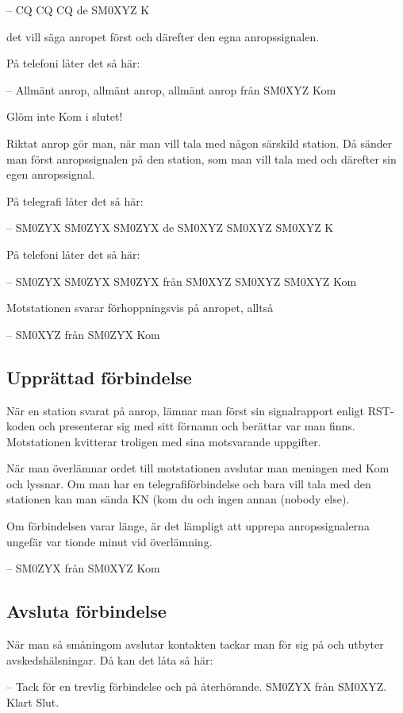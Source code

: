 -- CQ CQ CQ de SM0XYZ K

det vill säga anropet först och därefter den egna anropssignalen.

På telefoni låter det så här:

-- Allmänt anrop, allmänt anrop, allmänt anrop från SM0XYZ Kom

Glöm inte Kom i slutet!

Riktat anrop gör man, när man vill tala med någon särskild station.
Då sänder man först anropssignalen på den station, som man vill tala med och
därefter sin egen anropssignal.

På telegrafi låter det så här:

-- SM0ZYX SM0ZYX SM0ZYX de SM0XYZ SM0XYZ SM0XYZ K

På telefoni låter det så här:

-- SM0ZYX SM0ZYX SM0ZYX från SM0XYZ SM0XYZ SM0XYZ Kom

Motstationen svarar förhoppningsvis på anropet, alltså

-- SM0XYZ från SM0ZYX Kom

\subsection{Upprättad förbindelse}

När en station svarat på anrop, lämnar man först sin signalrapport
enligt RST-koden och presenterar sig med sitt förnamn och berättar var man finns.
Motstationen kvitterar troligen med sina motsvarande uppgifter.

När man överlämnar ordet till motstationen avslutar man meningen med Kom och lyssnar.
Om man har en telegrafiförbindelse och bara vill tala med den stationen kan man
sända KN (kom du och ingen annan (nobody else).

Om förbindelsen varar länge, är det lämpligt att upprepa anropssignalerna ungefär var tionde minut vid överlämning.

-- SM0ZYX från SM0XYZ Kom

\subsection{Avsluta förbindelse}

När man så småningom avslutar kontakten tackar man för sig på och utbyter avskedshälsningar. Då kan det låta så här:

-- Tack för en trevlig förbindelse och på återhörande. SM0ZYX från
SM0XYZ. Klart Slut.

